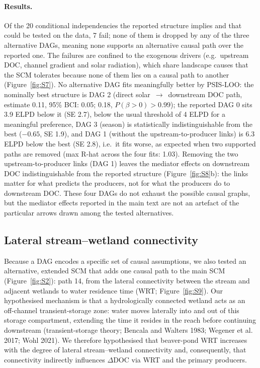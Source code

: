 \documentclass[11pt,a4paper]{article}
\begin{document}
\paragraph{Results.} Of the 20 conditional independencies the reported structure implies and that could be tested on the data, 7 fail; none of them is dropped by any of the three alternative DAGs, meaning none supports an alternative causal path over the reported one. The failures are confined to the exogenous drivers (e.g.\ upstream DOC, channel gradient and solar radiation), which share landscape causes that the SCM tolerates because none of them lies on a causal path to another (Figure~\ref{fig:S7}). No alternative DAG fits meaningfully better by PSIS-LOO: the nominally best structure is DAG 2 (direct solar~$\rightarrow$~downstream DOC path, estimate 0.11, 95\% BCI: 0.05; 0.18, $P(\beta>0) > 0.99$); the reported DAG 0 sits 3.9 ELPD below it (SE 2.7), below the usual threshold of 4 ELPD for a meaningful preference, DAG 3 (season) is statistically indistinguishable from the best ($-0.65$, SE 1.9), and DAG 1 (without the upstream-to-producer links) is 6.3 ELPD below the best (SE 2.8), i.e.\ it fits worse, as expected when two supported paths are removed (max R-hat across the four fits: 1.03). Removing the two upstream-to-producer links (DAG 1) leaves the mediator effects on downstream DOC indistinguishable from the reported structure (Figure~\ref{fig:S8}b): the links matter for what predicts the producers, not for what the producers do to downstream DOC. These four DAGs do not exhaust the possible causal graphs, but the mediator effects reported in the main text are not an artefact of the particular arrows drawn among the tested alternatives.

\FloatBarrier
\subsection{Lateral stream--wetland connectivity}
Because a DAG encodes a specific set of causal assumptions, we also tested an alternative, extended SCM that adds one causal path to the main SCM (Figure~\ref{fig:S2}): path 14, from the lateral connectivity between the stream and adjacent wetlands to water residence time (WRT; Figure~\ref{fig:S9}). Our hypothesised mechanism is that a hydrologically connected wetland acts as an off-channel transient-storage zone: water moves laterally into and out of this storage compartment, extending the time it resides in the reach before continuing downstream (transient-storage theory; Bencala and Walters 1983; Wegener et al. 2017; Wohl 2021). We therefore hypothesised that beaver-pond WRT increases with the degree of lateral stream--wetland connectivity and, consequently, that connectivity indirectly influences $\Delta$DOC via WRT and the primary producers.
\end{document}
